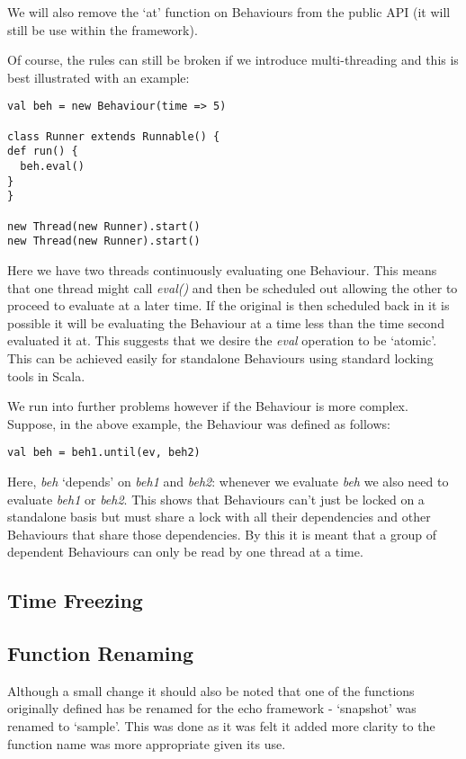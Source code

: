       We will also remove the `at' function on Behaviours from the public API (it will still be
      use within the framework). 
      
      Of course, the rules can still be broken if we introduce multi-threading and this is best illustrated
      with an example:
      
\begin{verbatim}
val beh = new Behaviour(time => 5)

class Runner extends Runnable() {
def run() {
  beh.eval()
}
}

new Thread(new Runner).start()
new Thread(new Runner).start()
\end{verbatim}       

      Here we have two threads continuously evaluating one Behaviour. This means that one thread
      might call \emph{eval()} and then be scheduled out allowing the other to proceed to evaluate
      at a later time. If the original is then scheduled back in it is possible it will
      be evaluating the Behaviour at a time less than the time second evaluated it at. This suggests
      that we desire the \emph{eval} operation to be `atomic'. This can be achieved easily for standalone
      Behaviours using standard locking tools in Scala.
      
      We run into further problems however if the Behaviour is more complex. Suppose, in the above example,
      the Behaviour was defined as follows:

\begin{verbatim}
val beh = beh1.until(ev, beh2)
\end{verbatim}        

      Here, \emph{beh} `depends' on \emph{beh1} and \emph{beh2}: whenever we evaluate \emph{beh}
      we also need to evaluate \emph{beh1} or \emph{beh2}. This shows that Behaviours can't just
      be locked on a standalone basis but must share a lock with all their dependencies and other Behaviours
      that share those dependencies. By this it is meant that a group of dependent Behaviours can
      only be read by one thread at a time.
      
    \subsection{Time Freezing}
    
    \subsection{Function Renaming}
      Although a small change it should also be noted that one of the functions originally defined
      has be renamed for the echo framework - `snapshot' was renamed to `sample'. This was done as
      it was felt it added more clarity to the function name was more appropriate given its use.
      
